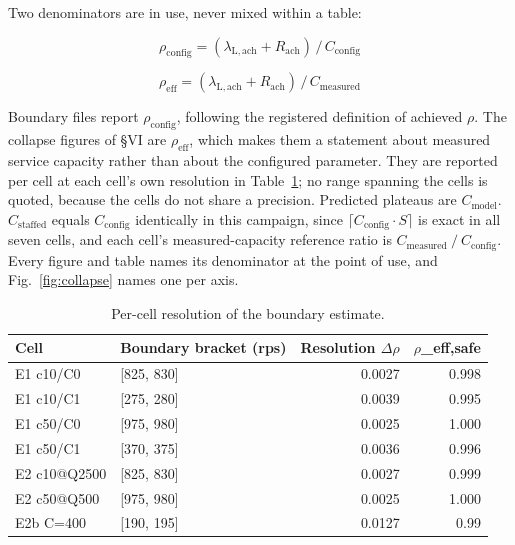 \documentclass{ieeeaccess}
\begin{document}
Two denominators are in use, never mixed within a table:

\begin{equation}
\rho_{\mathrm{config}} = ( \lambda_{\mathrm{L,ach}} + R_{\mathrm{ach}} ) \,/\, C_{\mathrm{config}}
\label{eq:7}
\end{equation}

\begin{equation}
\rho_{\mathrm{eff}} = ( \lambda_{\mathrm{L,ach}} + R_{\mathrm{ach}} ) \,/\, C_{\mathrm{measured}}
\label{eq:8}
\end{equation}

Boundary files report $\rho_{\mathrm{config}}$, following the registered definition of achieved $\rho$. The collapse figures of \S{}VI are $\rho_{\mathrm{eff}}$, which makes them a statement about measured service capacity rather than about the configured parameter. They are reported per cell at each cell's own resolution in Table~\ref{tab:resolution}; no range spanning the cells is quoted, because the cells do not share a precision. Predicted plateaus are $C_{\mathrm{model}}$. $C_{\mathrm{staffed}}$ equals $C_{\mathrm{config}}$ identically in this campaign, since $\lceil C_{\mathrm{config}} \cdot S \rceil$ is exact in all seven cells, and each cell's measured-capacity reference ratio is $C_{\mathrm{measured}} \mathbin{/} C_{\mathrm{config}}$. Every figure and table names its denominator at the point of use, and Fig.~\ref{fig:collapse} names one per axis.

\begin{table}[!t]
\caption[Per-cell resolution of the boundary estimate.]{Per-cell resolution of the boundary estimate.}
\label{tab:resolution}
\centering
\footnotesize
\begin{tabular}{llrr}
\hline
{\bfseries Cell} & {\bfseries Boundary bracket (rps)} & {\bfseries Resolution $\Delta$$\rho$} & {\bfseries $\rho$\_eff,safe} \\ \hline
E1 c10/C0 & [825, 830] & 0.0027 & 0.998 \\
E1 c10/C1 & [275, 280] & 0.0039 & 0.995 \\
E1 c50/C0 & [975, 980] & 0.0025 & 1.000 \\
E1 c50/C1 & [370, 375] & 0.0036 & 0.996 \\
E2 c10@Q2500 & [825, 830] & 0.0027 & 0.999 \\
E2 c50@Q500 & [975, 980] & 0.0025 & 1.000 \\
E2b C=400 & [190, 195] & 0.0127 & 0.99 \\
\hline
\end{tabular}
\end{table}
\end{document}
